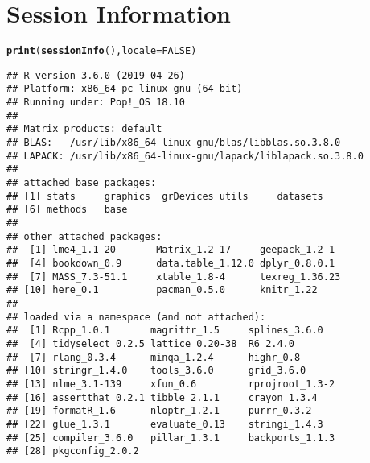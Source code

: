 \documentclass[11pt,letter]{article}\usepackage[]{graphicx}\usepackage[]{color}
\makeatletter
\newcommand{\hlnum}[1]{\textcolor[rgb]{0.686,0.059,0.569}{#1}}%
\newcommand{\hlstd}[1]{\textcolor[rgb]{0.345,0.345,0.345}{#1}}%
\newcommand{\hlkwc}[1]{\textcolor[rgb]{0.333,0.667,0.333}{#1}}%
\newcommand{\hlkwd}[1]{\textcolor[rgb]{0.737,0.353,0.396}{\textbf{#1}}}%
\newenvironment{kframe}{%
 \def\at@end@of@kframe{}%
 \ifinner\ifhmode%
  \def\at@end@of@kframe{\end{minipage}}%
  \begin{minipage}{\columnwidth}%
 \fi\fi%
 \def\FrameCommand##1{\hskip\@totalleftmargin \hskip-\fboxsep
 \colorbox{shadecolor}{##1}\hskip-\fboxsep
     \hskip-\linewidth \hskip-\@totalleftmargin \hskip\columnwidth}%
 \MakeFramed {\advance\hsize-\width
   \@totalleftmargin\z@ \linewidth\hsize
   \@setminipage}}%
 {\par\unskip\endMakeFramed%
 \at@end@of@kframe}
\newenvironment{knitrout}{}{} %
\makeatother
\begin{document}
\section{Session Information}
\begin{knitrout}
\color{fgcolor}\begin{kframe}
\begin{alltt}
\hlkwd{print}\hlstd{(}\hlkwd{sessionInfo}\hlstd{(),} \hlkwc{locale} \hlstd{=} \hlnum{FALSE}\hlstd{)}
\end{alltt}
\begin{verbatim}
## R version 3.6.0 (2019-04-26)
## Platform: x86_64-pc-linux-gnu (64-bit)
## Running under: Pop!_OS 18.10
## 
## Matrix products: default
## BLAS:   /usr/lib/x86_64-linux-gnu/blas/libblas.so.3.8.0
## LAPACK: /usr/lib/x86_64-linux-gnu/lapack/liblapack.so.3.8.0
## 
## attached base packages:
## [1] stats     graphics  grDevices utils     datasets 
## [6] methods   base     
## 
## other attached packages:
##  [1] lme4_1.1-20       Matrix_1.2-17     geepack_1.2-1    
##  [4] bookdown_0.9      data.table_1.12.0 dplyr_0.8.0.1    
##  [7] MASS_7.3-51.1     xtable_1.8-4      texreg_1.36.23   
## [10] here_0.1          pacman_0.5.0      knitr_1.22       
## 
## loaded via a namespace (and not attached):
##  [1] Rcpp_1.0.1       magrittr_1.5     splines_3.6.0   
##  [4] tidyselect_0.2.5 lattice_0.20-38  R6_2.4.0        
##  [7] rlang_0.3.4      minqa_1.2.4      highr_0.8       
## [10] stringr_1.4.0    tools_3.6.0      grid_3.6.0      
## [13] nlme_3.1-139     xfun_0.6         rprojroot_1.3-2 
## [16] assertthat_0.2.1 tibble_2.1.1     crayon_1.3.4    
## [19] formatR_1.6      nloptr_1.2.1     purrr_0.3.2     
## [22] glue_1.3.1       evaluate_0.13    stringi_1.4.3   
## [25] compiler_3.6.0   pillar_1.3.1     backports_1.1.3 
## [28] pkgconfig_2.0.2
\end{verbatim}
\end{kframe}
\end{knitrout}
\end{document}
